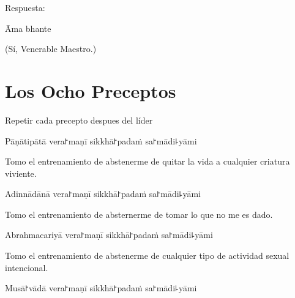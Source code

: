 \begin{instruction}
  Respuesta:
\end{instruction}

Āma bhante

\begin{english}
  (Sí, Venerable Maestro.)
\end{english}

\chapter{Los Ocho Preceptos}

\begin{instruction}
  Repetir cada precepto despues del líder
\end{instruction}

\begin{precept}
  \setcounter{enumi}{0}
  \item Pāṇātipātā vera꜓maṇī sikkhā꜓padaṁ sa꜓mādi꜕yāmi
\end{precept}

\begin{english}
  Tomo el entrenamiento de abstenerme de quitar la vida a cualquier criatura viviente.
\end{english}

\begin{precept}
  \setcounter{enumi}{1}
  \item Adinnādānā vera꜓maṇī sikkhā꜓padaṁ sa꜓mādi꜕yāmi
\end{precept}

\begin{english}
  Tomo el entrenamiento de absternerme de tomar lo que no me es dado.
\end{english}

\begin{precept}
  \setcounter{enumi}{2}
  \item Abrahmacariyā vera꜓maṇī sikkhā꜓padaṁ sa꜓mādi꜕yāmi
\end{precept}

\begin{english}
  Tomo el entrenamiento de abstenerme de cualquier tipo de actividad sexual intencional.
\end{english}

\begin{precept}
  \setcounter{enumi}{3}
  \item Musā꜓vādā vera꜓maṇī sikkhā꜓padaṁ sa꜓mādi꜕yāmi
\end{precept}

